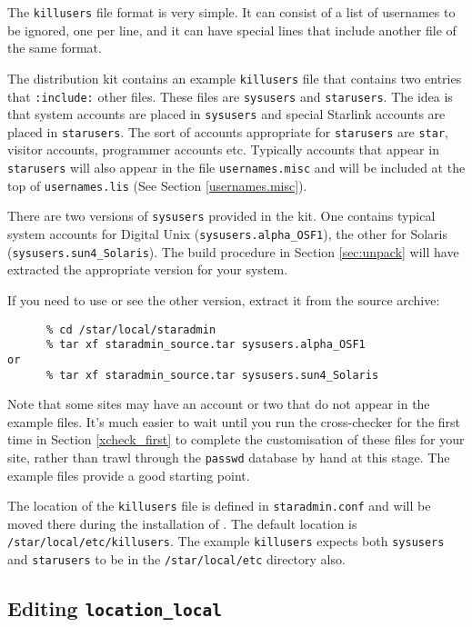 The {\tt killusers} file format is very simple. It can consist of a list of
usernames to be ignored, one per line, and it can have special lines that
include another file of the same format.

The distribution kit contains an example {\tt killusers} file that contains two
entries that {\tt :include:} other files. These files are {\tt sysusers} and
{\tt starusers}. The idea is that system accounts are placed in {\tt sysusers}
and special Starlink accounts are placed in {\tt starusers}. The sort of
accounts appropriate for {\tt starusers} are {\tt star}, visitor accounts,
programmer accounts etc. Typically accounts that appear in {\tt starusers} will
also appear in the file {\tt usernames.misc} and will be included at the top of
{\tt usernames.lis} (See Section \ref{usernames.misc}).

There are two versions of {\tt sysusers} provided in the kit. One contains
typical system accounts for Digital Unix ({\tt sysusers.alpha\_OSF1}), the
other for Solaris ({\tt sysusers.sun4\_Solaris}).  The build procedure in
Section \ref{sec:unpack} will have extracted the appropriate version for
your system.

If you need to use or see the other version, extract it from the source
archive:

\begin{verbatim}
      % cd /star/local/staradmin
      % tar xf staradmin_source.tar sysusers.alpha_OSF1
or
      % tar xf staradmin_source.tar sysusers.sun4_Solaris
\end{verbatim}

Note that some sites may have an account or two that do not appear in
the example files. It's much easier to wait until you run the
cross-checker for the first time in Section \ref{xcheck_first} to
complete the customisation of these files for your site, rather than
trawl through the {\tt passwd} database by hand at this stage. The
example files provide a good starting point.

The location of the {\tt killusers} file is defined in {\tt staradmin.conf}
and will be moved there during the installation of \staradmin. The default
location is {\tt /star/local/etc/killusers}. The example {\tt killusers}
expects both {\tt sysusers} and {\tt starusers} to be in the
{\tt /star/local/etc} directory also.

\subsection{Editing {\tt location\_local}}

